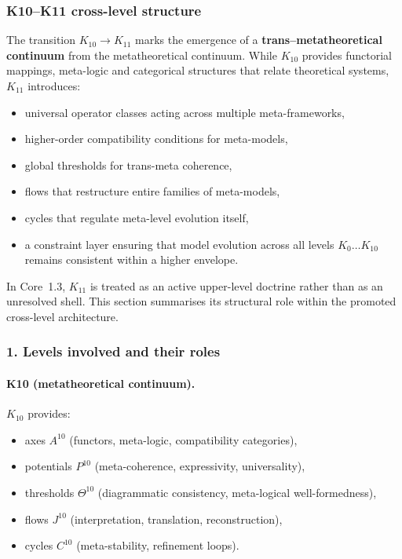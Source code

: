 
\subsubsection{K10–K11 cross-level structure}
\label{sec:crossk-k10-k11}

The transition $K_{10} \rightarrow K_{11}$ marks the emergence of a
\textbf{trans–metatheoretical continuum} from the metatheoretical
continuum. While $K_{10}$ provides functorial mappings, meta-logic and
categorical structures that relate theoretical systems, $K_{11}$ introduces:
\begin{itemize}
  \item universal operator classes acting across multiple meta-frameworks,
  \item higher-order compatibility conditions for meta-models,
  \item global thresholds for trans-meta coherence,
  \item flows that restructure entire families of meta-models,
  \item cycles that regulate meta-level evolution itself,
  \item a constraint layer ensuring that model evolution across all levels
        $K_0\dots K_{10}$ remains consistent within a higher envelope.
\end{itemize}

In Core~1.3, $K_{11}$ is treated as an active upper-level doctrine rather than
as an unresolved shell. This section summarises its structural role
within the promoted cross-level architecture.

\subsubsection{1. Levels involved and their roles}

\paragraph{K10 (metatheoretical continuum).}
$K_{10}$ provides:
\begin{itemize}
  \item axes $A^{10}$ (functors, meta-logic, compatibility categories),
  \item potentials $P^{10}$ (meta-coherence, expressivity, universality),
  \item thresholds $\Theta^{10}$ (diagrammatic consistency,
        meta-logical well-formedness),
  \item flows $J^{10}$ (interpretation, translation, reconstruction),
  \item cycles $C^{10}$ (meta-stability, refinement loops).
\end{itemize}

